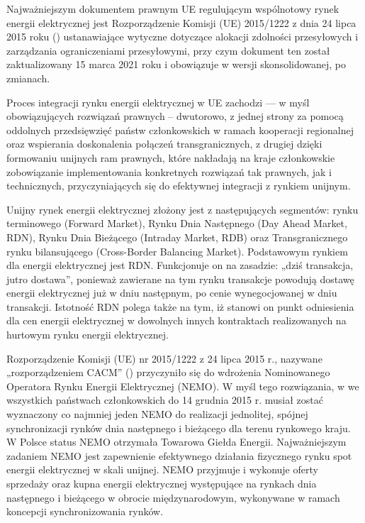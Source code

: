 \documentclass[polish, twoside, 12pt, a4paper]{article}
\theoremstyle{definition}
\theoremstyle{plain}
\theoremstyle{remark}
\begin{document}
Najważniejszym dokumentem prawnym UE regulującym wspólnotowy rynek energii elektrycznej jest Rozporządzenie Komisji (UE) 2015/1222 z dnia 24 lipca 2015 roku (\cite{ec2015}) ustanawiające wytyczne dotyczące alokacji zdolności przesyłowych i zarządzania ograniczeniami przesyłowymi, przy czym dokument ten został zaktualizowany 15 marca 2021 roku i obowiązuje w wersji skonsolidowanej, po zmianach. 

Proces integracji rynku energii elektrycznej w UE zachodzi --- w myśl obowiązujących rozwiązań prawnych – dwutorowo, z jednej strony za pomocą oddolnych przedsięwzięć państw członkowskich w ramach kooperacji regionalnej oraz wspierania doskonalenia połączeń transgranicznych, z drugiej dzięki formowaniu unijnych ram prawnych, które nakładają na kraje członkowskie zobowiązanie implementowania konkretnych rozwiązań tak prawnych, jak i technicznych, przyczyniających się do efektywnej integracji z rynkiem unijnym. 

Unijny rynek energii elektrycznej złożony jest z następujących segmentów: rynku terminowego (Forward Market), Rynku Dnia Następnego (Day Ahead Market, RDN), Rynku Dnia Bieżącego (Intraday Market, RDB) oraz Transgranicznego rynku bilansującego (Cross-Border Balancing Market). Podstawowym rynkiem dla energii elektrycznej jest RDN. Funkcjonuje on na zasadzie: „dziś transakcja, jutro dostawa”, ponieważ zawierane na tym rynku transakcje powodują dostawę energii elektrycznej już w dniu następnym, po cenie wynegocjowanej w dniu transakcji. Istotność RDN polega także na tym, iż stanowi on punkt odniesienia dla cen energii elektrycznej w dowolnych innych kontraktach realizowanych na hurtowym rynku energii elektrycznej.

Rozporządzenie Komisji (UE) nr 2015/1222 z 24 lipca 2015 r., nazywane „rozporządzeniem CACM” (\cite{ec2015}) przyczyniło się do wdrożenia Nominowanego Operatora Rynku Energii Elektrycznej (NEMO). W myśl tego rozwiązania, w we wszystkich państwach członkowskich do 14 grudnia 2015 r. musiał zostać wyznaczony co najmniej jeden NEMO do realizacji jednolitej, spójnej synchronizacji rynków dnia następnego i bieżącego dla terenu rynkowego kraju. W Polsce status NEMO otrzymała Towarowa Giełda Energii. Najważniejszym zadaniem NEMO jest zapewnienie efektywnego działania fizycznego rynku spot energii elektrycznej w skali unijnej. NEMO przyjmuje i wykonuje oferty sprzedaży oraz kupna energii elektrycznej występujące na rynkach dnia następnego i bieżącego w obrocie międzynarodowym, wykonywane w ramach koncepcji synchronizowania rynków. 
\end{document}
